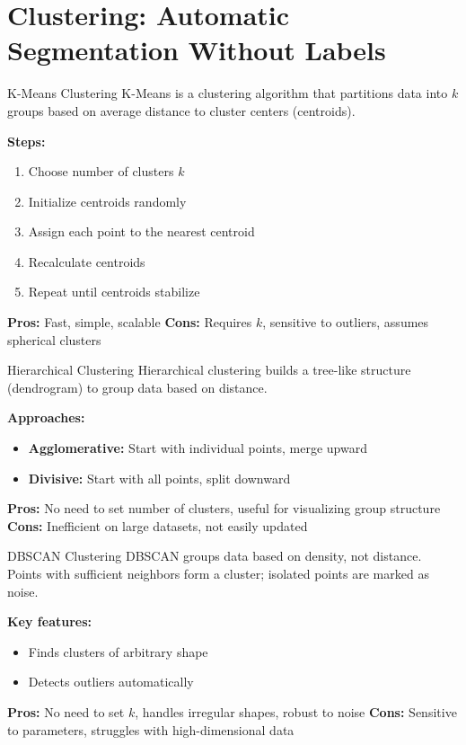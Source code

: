 \documentclass[aspectratio=169, table]{beamer}
\begin{document}
\section{Clustering: Automatic Segmentation Without Labels}

\begin{frame}{K-Means Clustering}
	K-Means is a clustering algorithm that partitions data into \(k\) groups based on average distance to cluster centers (centroids).
	
	\textbf{Steps:}
	\begin{enumerate}
		\item Choose number of clusters \(k\)
		\item Initialize centroids randomly
		\item Assign each point to the nearest centroid
		\item Recalculate centroids
		\item Repeat until centroids stabilize
	\end{enumerate}
	
	\textbf{Pros:} Fast, simple, scalable  
	\textbf{Cons:} Requires \(k\), sensitive to outliers, assumes spherical clusters
\end{frame}

\begin{frame}{Hierarchical Clustering}
	Hierarchical clustering builds a tree-like structure (dendrogram) to group data based on distance.
	
	\textbf{Approaches:}
	\begin{itemize}
		\item \textbf{Agglomerative:} Start with individual points, merge upward
		\item \textbf{Divisive:} Start with all points, split downward
	\end{itemize}
	
	\textbf{Pros:} No need to set number of clusters, useful for visualizing group structure  
	\textbf{Cons:} Inefficient on large datasets, not easily updated
\end{frame}

\begin{frame}{DBSCAN Clustering}
	DBSCAN groups data based on density, not distance. Points with sufficient neighbors form a cluster; isolated points are marked as noise.
	
	\textbf{Key features:}
	\begin{itemize}
		\item Finds clusters of arbitrary shape
		\item Detects outliers automatically
	\end{itemize}
	
	\textbf{Pros:} No need to set \(k\), handles irregular shapes, robust to noise  
	\textbf{Cons:} Sensitive to parameters, struggles with high-dimensional data
\end{frame}
\end{document}
